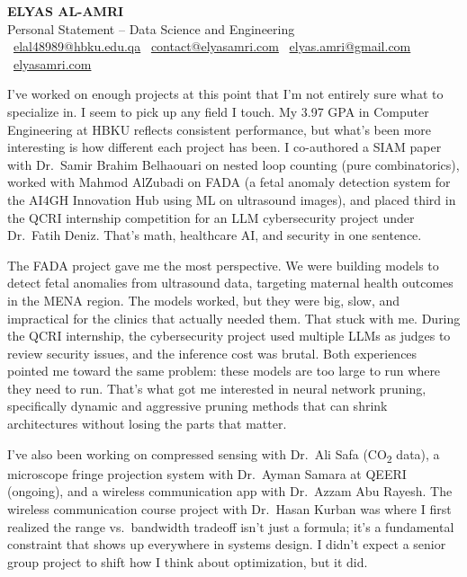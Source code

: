 \documentclass[11pt,a4paper]{article}
\begin{document}
\begin{center}
    {\Large\bfseries\color{headercolor} ELYAS AL-AMRI} \\[4pt]
    {\normalsize Personal Statement -- Data Science and Engineering} \\[2pt]
    {\small \faEnvelope\ \href{mailto:elal48989@hbku.edu.qa}{elal48989@hbku.edu.qa} \quad \faEnvelope\ \href{mailto:contact@elyasamri.com}{contact@elyasamri.com} \quad \faEnvelope\ \href{mailto:elyas.amri@gmail.com}{elyas.amri@gmail.com} \quad \faGlobe\ \href{https://elyasamri.com}{elyasamri.com}}
\end{center}

\vspace{6pt}

I've worked on enough projects at this point that I'm not entirely sure what to specialize in. I seem to pick up any field I touch. My 3.97 GPA in Computer Engineering at HBKU reflects consistent performance, but what's been more interesting is how different each project has been. I co-authored a SIAM paper with Dr.\ Samir Brahim Belhaouari on nested loop counting (pure combinatorics), worked with Mahmod AlZubadi on FADA (a fetal anomaly detection system for the AI4GH Innovation Hub using ML on ultrasound images), and placed third in the QCRI internship competition for an LLM cybersecurity project under Dr.\ Fatih Deniz. That's math, healthcare AI, and security in one sentence.

The FADA project gave me the most perspective. We were building models to detect fetal anomalies from ultrasound data, targeting maternal health outcomes in the MENA region. The models worked, but they were big, slow, and impractical for the clinics that actually needed them. That stuck with me. During the QCRI internship, the cybersecurity project used multiple LLMs as judges to review security issues, and the inference cost was brutal. Both experiences pointed me toward the same problem: these models are too large to run where they need to run. That's what got me interested in neural network pruning, specifically dynamic and aggressive pruning methods that can shrink architectures without losing the parts that matter.

I've also been working on compressed sensing with Dr.\ Ali Safa (CO\textsubscript{2} data), a microscope fringe projection system with Dr.\ Ayman Samara at QEERI (ongoing), and a wireless communication app with Dr.\ Azzam Abu Rayesh. The wireless communication course project with Dr.\ Hasan Kurban was where I first realized the range vs.\ bandwidth tradeoff isn't just a formula; it's a fundamental constraint that shows up everywhere in systems design. I didn't expect a senior group project to shift how I think about optimization, but it did.
\end{document}
